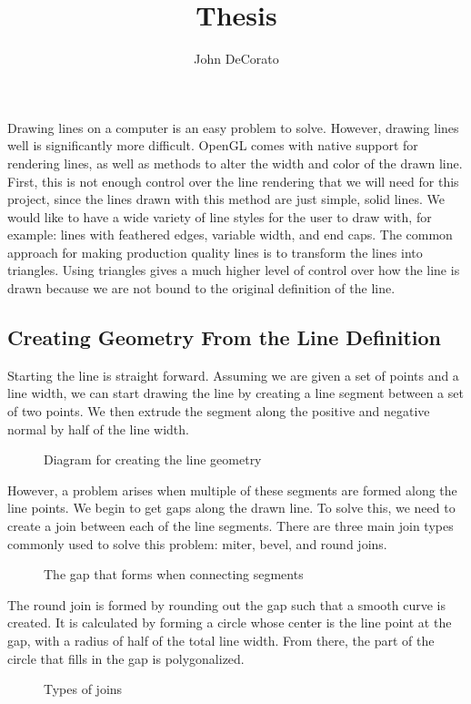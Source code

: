 \documentclass{article}
\title{Thesis}
\author{John DeCorato}
\date{ }
\begin{document}
 
Drawing lines on a computer is an easy problem to solve. 
However, drawing lines well is significantly more difficult.
OpenGL comes with native support for rendering lines, as well as methods to alter the width and color of the drawn line.
First, this is not enough control over the line rendering that we will need for this project, since the lines drawn with this method are just simple, solid lines.
We would like to have a wide variety of line styles for the user to draw with, for example: lines with feathered edges, variable width, and end caps.
The common approach for making production quality lines is to transform the lines into triangles. 
Using triangles gives a much higher level of control over how the line is drawn because we are not bound to the original definition of the line.

\subsection{Creating Geometry From the Line Definition}

Starting the line is straight forward. 
Assuming we are given a set of points and a line width, we can start drawing the line by creating a line segment between a set of two points. We then extrude the segment along the positive and negative normal by half of the line width.

\begin{figure}
	\caption{Diagram for creating the line geometry}
\end{figure}


However, a problem arises when multiple of these segments are formed along the line points.
We begin to get gaps along the drawn line. 
To solve this, we need to create a join between each of the line segments.
There are three main join types commonly used to solve this problem: miter, bevel, and round joins.

\begin{figure}
	\caption{The gap that forms when connecting segments}
\end{figure}

The round join is formed by rounding out the gap such that a smooth curve is created. 
It is calculated by forming a circle whose center is the line point at the gap, with a radius of half of the total line width. 
From there, the part of the circle that fills in the gap is polygonalized.

\begin{figure}
	\caption{Types of joins}
\end{figure}
\end{document}
